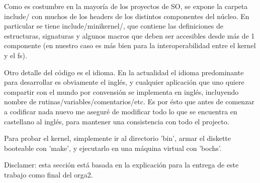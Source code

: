 Como es costumbre en la mayoría de los proyectos de SO, se expone la carpeta
include/ con muchos de los headers de los distintos componentes del núcleo. En
particular se tiene include/minikernel/, que contiene las definiciones de
estructuras, signaturas y algunos macros que deben ser accesibles desde más de
1 componente (en nuestro caso es más bien para la interoperabilidad entre el
kernel y el fs).

Otro detalle del código es el idioma. En la actualidad el idioma predominante
para desarrollar es obviamente el inglés, y cualquier aplicación que uno quiere
compartir con el mundo por convensión se implementa en inglés, incluyendo nombre
de rutinas/variables/comentarios/etc. Es por ésto que antes de comenzar a
codificar nada nuevo me aseguré de modificar todo lo que se encuentra en
castellano al inglés, para mantener una consistencia con todo el projecto.

Para probar el kernel, simplemente ir al directorio 'bin', armar el diskette
booteable con 'make', y ejecutarlo en una máquina virtual con 'bochs'.

Disclamer: esta sección está basada en la explicación para la entrega de este
trabajo como final del orga2.

